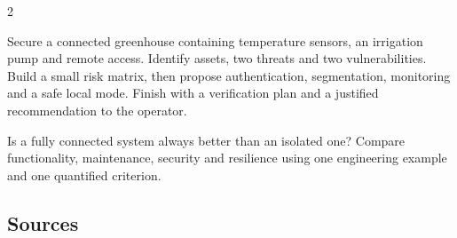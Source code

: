 \begin{multicols}{2}
\begin{engineeringchallenge}
Secure a connected greenhouse containing temperature sensors, an irrigation pump and remote access.
Identify assets, two threats and two vulnerabilities. Build a small risk matrix, then propose
authentication, segmentation, monitoring and a safe local mode. Finish with a verification plan and a
justified recommendation to the operator.
\end{engineeringchallenge}

\begin{speaking}
Is a fully connected system always better than an isolated one? Compare functionality, maintenance,
security and resilience using one engineering example and one quantified criterion.
\end{speaking}
\end{multicols}

\subsection*{Sources}
